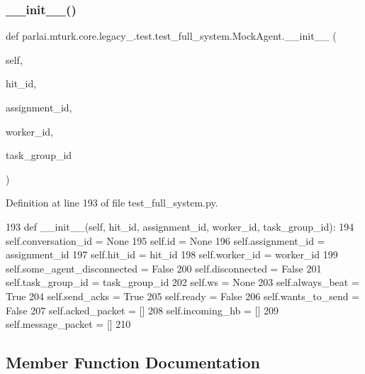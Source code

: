 \subsubsection{\texorpdfstring{\+\_\+\+\_\+init\+\_\+\+\_\+()}{\_\_init\_\_()}}
{\footnotesize\ttfamily def parlai.\+mturk.\+core.\+legacy\+\_.\+test.\+test\+\_\+full\+\_\+system.\+Mock\+Agent.\+\_\+\+\_\+init\+\_\+\+\_\+ (\begin{DoxyParamCaption}\item[{}]{self,  }\item[{}]{hit\+\_\+id,  }\item[{}]{assignment\+\_\+id,  }\item[{}]{worker\+\_\+id,  }\item[{}]{task\+\_\+group\+\_\+id }\end{DoxyParamCaption})}



Definition at line 193 of file test\+\_\+full\+\_\+system.\+py.


\begin{DoxyCode}
193     \textcolor{keyword}{def }\_\_init\_\_(self, hit\_id, assignment\_id, worker\_id, task\_group\_id):
194         self.conversation\_id = \textcolor{keywordtype}{None}
195         self.id = \textcolor{keywordtype}{None}
196         self.assignment\_id = assignment\_id
197         self.hit\_id = hit\_id
198         self.worker\_id = worker\_id
199         self.some\_agent\_disconnected = \textcolor{keyword}{False}
200         self.disconnected = \textcolor{keyword}{False}
201         self.task\_group\_id = task\_group\_id
202         self.ws = \textcolor{keywordtype}{None}
203         self.always\_beat = \textcolor{keyword}{True}
204         self.send\_acks = \textcolor{keyword}{True}
205         self.ready = \textcolor{keyword}{False}
206         self.wants\_to\_send = \textcolor{keyword}{False}
207         self.acked\_packet = []
208         self.incoming\_hb = []
209         self.message\_packet = []
210 
\end{DoxyCode}


\subsection{Member Function Documentation}
\mbox{\label{classparlai_1_1mturk_1_1core_1_1legacy__2018_1_1test_1_1test__full__system_1_1MockAgent_a70db268b46d8495b81f2640e53bab891}} 
